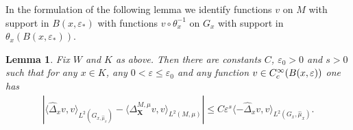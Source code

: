 \documentclass[11pt]{article}
\newcommand{\rc}{\textup{c}}
\newcommand{\bX}{{\boldsymbol{X}}}
\newtheorem{lemma}[theorem]{Lemma}
\theoremstyle{definition}
\let\epsilon\varepsilon
\let\Xb\bX
\newcommand{\1}{\mathbbm{1}}
\numberwithin{equation}{section}
\begin{document}
In the formulation of the following lemma we identify functions $v$ on $M$ with support in $B(x,\epsilon_*)$ with functions $v\circ\theta_x^{-1}$ on $G_{x}$ with support in $\theta_x(B(x,\epsilon_*))$.

\begin{lemma}\label{l:remainder2}
Fix $W$ and $K$ as above. Then there are constants $C$, $\epsilon_0>0$ and $s>0$ such that for any $x\in K$, any $0<\epsilon\leq\epsilon_0$ and any function $v\in C^\infty_\rc(B(x,\epsilon))$ one has
\begin{align*}
\left| \langle \widehat{\Delta}_{x} v, v \rangle_{L^2(G_{x,\widehat\mu_{x}})} - \langle \Delta_\Xb^{M,\mu} v, v \rangle_{L^2(M,\mu)}\right| \leq C \epsilon^s \langle - \widehat{\Delta}_{x} v, v \rangle_{L^2(G_{x},\widehat\mu_{x})}.
\end{align*}
\end{lemma}
\end{document}
